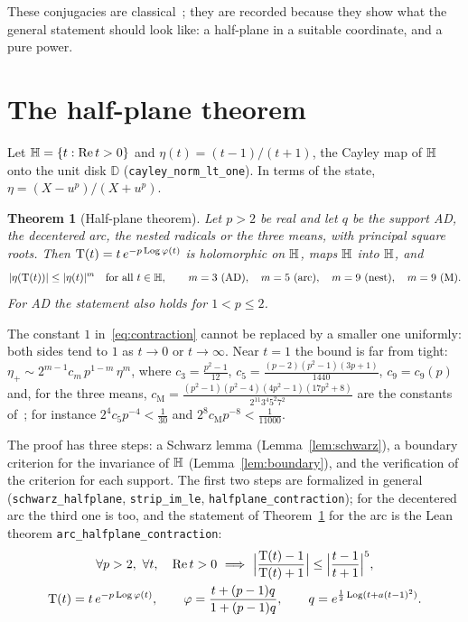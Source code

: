 \documentclass[10pt,a4paper]{article}
\theoremstyle{plain}
\newtheorem{theorem}{Theorem}[section]
\theoremstyle{remark}
\numberwithin{equation}{section}
\newcommand{\D}{\mathbb{D}}
\newcommand{\Tm}{\mathrm{T}}
\DeclareMathOperator{\re}{Re}\DeclareMathOperator{\im}{Im}
\newcommand{\lean}[1]{\texttt{#1}}
\begin{document}
These conjugacies are classical~\cite{cayley,schroder}; they are recorded because they show what
the general statement should look like: a half-plane in a suitable coordinate, and a pure power.

\section{The half-plane theorem}\label{sec:half}

Let $\Hp=\{t:\re t>0\}$ and $\eta(t)=(t-1)/(t+1)$, the Cayley map of $\mathbb{H}$ onto the unit disk $\D$
(\lean{cayley\_norm\_lt\_one}). In terms of the state, $\eta=(X-u^{p})/(X+u^{p})$.

\begin{theorem}[Half-plane theorem]\label{thm:half}
Let $p>2$ be real and let $q$ be the support AD, the decentered arc, the nested radicals or the
three means, with principal square roots. Then $\Tm(t)=t\,e^{-p\Log\varphi(t)}$ is holomorphic on
$\mathbb{H}$, maps $\mathbb{H}$ into $\mathbb{H}$, and
\begin{equation}\label{eq:contraction}
  |\eta(\Tm(t))|\le|\eta(t)|^{m}\quad\text{for all }t\in\Hp,\qquad
  m=3\ (\mathrm{AD}),\quad m=5\ (\mathrm{arc}),\quad m=9\ (\mathrm{nest}),\quad m=9\ (\mathrm M).
\end{equation}
For AD the statement also holds for $1<p\le2$.
\end{theorem}

The constant $1$ in~\eqref{eq:contraction} cannot be replaced by a smaller one uniformly: both sides
tend to $1$ as $t\to0$ or $t\to\infty$. Near $t=1$ the bound is far from tight:
$\eta_+\sim2^{m-1}c_m\,p^{1-m}\,\eta^{m}$, where $c_3=\frac{p^{2}-1}{12}$,
$c_5=\frac{(p-2)(p^{2}-1)(3p+1)}{1440}$, $c_9=c_9(p)$ and, for the three means,
$c_{\mathrm M}=\frac{(p^{2}-1)(p^{2}-4)(4p^{2}-1)(17p^{2}+8)}{2^{11}3^{4}5^{2}7^{2}}$ are the
constants of~\cite{v28,v29}; for instance $2^{4}c_5p^{-4}<\frac1{30}$ and
$2^{8}c_{\mathrm M}p^{-8}<\frac1{11000}$.

The proof has three steps: a Schwarz lemma (Lemma~\ref{lem:schwarz}), a boundary criterion for the
invariance of $\mathbb{H}$ (Lemma~\ref{lem:boundary}), and the verification of the criterion for each
support. The first two steps are formalized in general (\lean{schwarz\_halfplane},
\lean{strip\_im\_le}, \lean{halfplane\_contraction}); for the decentered arc the third one is too,
and the statement of Theorem~\ref{thm:half} for the arc is the Lean theorem
\lean{arc\_halfplane\_contraction}:
\begin{gather*}
 \forall p>2,\ \forall t,\quad \re t>0\ \Longrightarrow\
 \Bigl|\frac{\Tm(t)-1}{\Tm(t)+1}\Bigr|\le\Bigl|\frac{t-1}{t+1}\Bigr|^{5},\\
 \Tm(t)=t\,e^{-p\Log\varphi(t)},\qquad \varphi=\frac{t+(p-1)q}{1+(p-1)q},\qquad
 q=e^{\frac12\Log(t+a(t-1)^{2})} .
\end{gather*}
\end{document}
